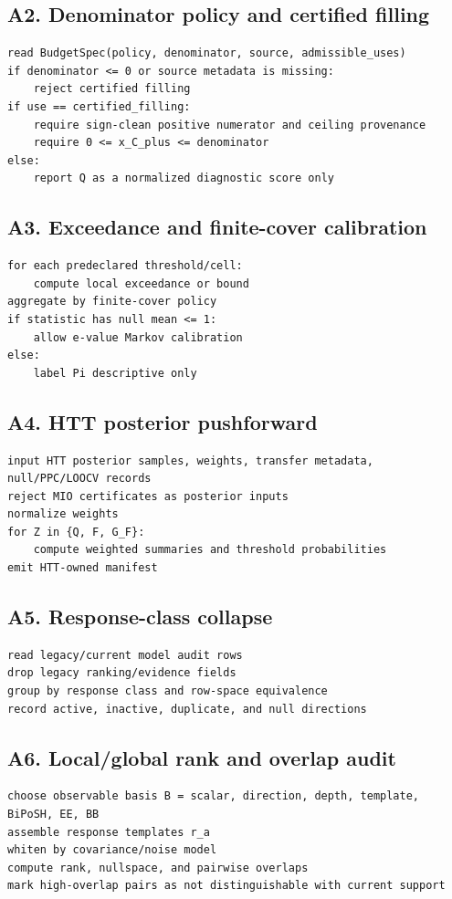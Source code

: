 \documentclass[11pt]{article}
\begin{document}
\subsection*{A2. Denominator policy and certified filling}
\begin{verbatim}
read BudgetSpec(policy, denominator, source, admissible_uses)
if denominator <= 0 or source metadata is missing:
    reject certified filling
if use == certified_filling:
    require sign-clean positive numerator and ceiling provenance
    require 0 <= x_C_plus <= denominator
else:
    report Q as a normalized diagnostic score only
\end{verbatim}

\subsection*{A3. Exceedance and finite-cover calibration}
\begin{verbatim}
for each predeclared threshold/cell:
    compute local exceedance or bound
aggregate by finite-cover policy
if statistic has null mean <= 1:
    allow e-value Markov calibration
else:
    label Pi descriptive only
\end{verbatim}

\subsection*{A4. HTT posterior pushforward}
\begin{verbatim}
input HTT posterior samples, weights, transfer metadata, null/PPC/LOOCV records
reject MIO certificates as posterior inputs
normalize weights
for Z in {Q, F, G_F}:
    compute weighted summaries and threshold probabilities
emit HTT-owned manifest
\end{verbatim}

\subsection*{A5. Response-class collapse}
\begin{verbatim}
read legacy/current model audit rows
drop legacy ranking/evidence fields
group by response class and row-space equivalence
record active, inactive, duplicate, and null directions
\end{verbatim}

\subsection*{A6. Local/global rank and overlap audit}
\begin{verbatim}
choose observable basis B = scalar, direction, depth, template, BiPoSH, EE, BB
assemble response templates r_a
whiten by covariance/noise model
compute rank, nullspace, and pairwise overlaps
mark high-overlap pairs as not distinguishable with current support
\end{verbatim}
\end{document}
